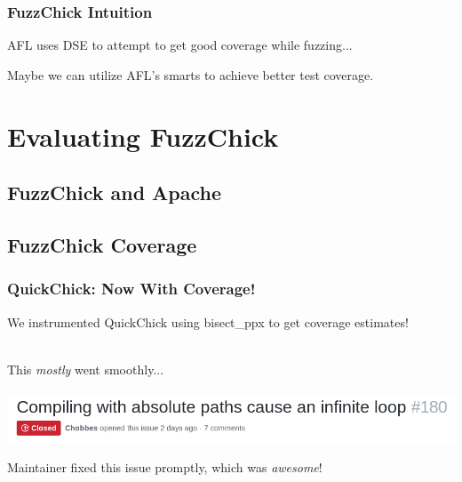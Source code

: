\documentclass{beamer}
\begin{document}
\begin{frame}
  \frametitle{FuzzChick Intuition}

  AFL uses DSE to attempt to get good coverage while fuzzing...\\

  \pause

  Maybe we can utilize AFL's smarts to achieve better test coverage.
\end{frame}

\section{Evaluating FuzzChick}

\subsection{FuzzChick and Apache}

\subsection{FuzzChick Coverage}

\begin{frame}
  \frametitle{QuickChick: Now With Coverage!}

  We instrumented QuickChick using bisect\_ppx to get coverage
  estimates!\\~\\

  \pause

  This \emph{mostly} went smoothly...\\~\\

  \includegraphics[width=\textwidth]{bisectbug.png} \\

  \pause

  Maintainer fixed this issue promptly, which was \emph{awesome}!
  
\end{frame}
\end{document}
